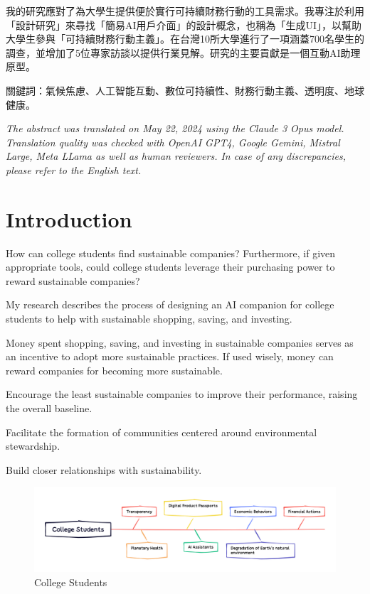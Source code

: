 \documentclass[
  letterpaper,
  DIV=11,
  numbers=noendperiod]{scrartcl}
\begin{document}
我的研究應對了為大學生提供便於實行可持續財務行動的工具需求。我專注於利用「設計研究」來尋找「簡易AI用戶介面」的設計概念，也稱為「生成UI」，以幫助大學生參與「可持續財務行動主義」。在台灣10所大學進行了一項涵蓋700名學生的調查，並增加了5位專家訪談以提供行業見解。研究的主要貢獻是一個互動AI助理原型。

關鍵詞：氣候焦慮、人工智能互動、數位可持續性、財務行動主義、透明度、地球健康。

\emph{The abstract was translated on May 22, 2024 using the Claude 3
Opus model. Translation quality was checked with OpenAI GPT4, Google
Gemini, Mistral Large, Meta LLama as well as human reviewers. In case of
any discrepancies, please refer to the English text.}

\newpage

\section{Introduction}\label{introduction}

How can college students find sustainable companies? Furthermore, if
given appropriate tools, could college students leverage their
purchasing power to reward sustainable companies?

My research describes the process of designing an AI companion for
college students to help with sustainable shopping, saving, and
investing.

Money spent shopping, saving, and investing in sustainable companies
serves as an incentive to adopt more sustainable practices. If used
wisely, money can reward companies for becoming more sustainable.

Encourage the least sustainable companies to improve their performance,
raising the overall baseline.

Facilitate the formation of communities centered around environmental
stewardship.

Build closer relationships with sustainability.

\begin{figure}[H]

{\centering \includegraphics[width=1\linewidth,height=\textheight,keepaspectratio]{./images/introduction/abstract.png}

}

\caption{College Students}

\end{figure}%
\end{document}
